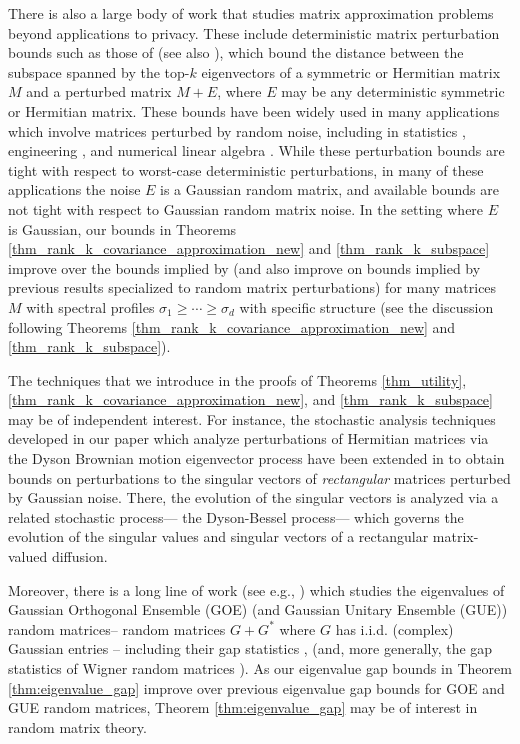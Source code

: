 \documentclass[11pt,letterpaper]{article}
\begin{document}
There is also a large body of work that studies matrix approximation problems beyond applications to privacy. 
%
These include deterministic matrix perturbation bounds such as those of \cite{davis1970rotation} (see also \cite{wedin1972perturbation}), which bound the distance between the subspace spanned by the top-$k$ eigenvectors of a symmetric or Hermitian matrix $M$ and a perturbed matrix $M + E$, where $E$ may be any deterministic symmetric or Hermitian matrix.
%
These bounds have been widely used in many applications which involve matrices perturbed by random noise, including in statistics \cite{yu2015useful}, engineering \cite{garg2021order, hajrya2013principal}, and numerical linear algebra \cite{cullum2002lanczos, hardt2014understanding}.
  While these perturbation bounds are tight with respect to worst-case deterministic perturbations, in many of these applications the noise $E$ is a Gaussian random matrix, and available bounds are not tight with respect to Gaussian random matrix noise.
   In the setting where $E$ is Gaussian, our bounds in Theorems \ref{thm_rank_k_covariance_approximation_new} and \ref{thm_rank_k_subspace} improve over the bounds implied by \cite{davis1970rotation} (and also improve on bounds implied by previous results \cite{o2018random} specialized to random matrix perturbations) for many matrices $M$ with spectral profiles $\sigma_1 \geq \cdots \geq \sigma_d$ with specific structure (see the discussion following Theorems \ref{thm_rank_k_covariance_approximation_new} and \ref{thm_rank_k_subspace}).
   
   
      The techniques that we introduce in the proofs of Theorems  \ref{thm_utility}, \ref{thm_rank_k_covariance_approximation_new}, and \ref{thm_rank_k_subspace} may be of independent interest.
  For instance, the stochastic analysis techniques developed in our paper which analyze perturbations of Hermitian matrices via the Dyson Brownian motion eigenvector process have been extended in \cite{lai2024singular} to obtain bounds on perturbations to the singular vectors of {\em rectangular} matrices perturbed by Gaussian noise.
%
 There, the evolution of the singular vectors is analyzed via a related stochastic process— the Dyson-Bessel process— which governs the evolution of the singular values and singular vectors of a rectangular matrix-valued diffusion.

Moreover, there is a long line of work (see e.g., \cite{wigner1955characteristic, dyson1962statistical, ginibre1965statistical, erdHos2012rigidity}) which studies the eigenvalues of Gaussian Orthogonal Ensemble (GOE) (and Gaussian Unitary Ensemble (GUE)) random matrices-- random matrices $G+G^\ast$ where $G$ has i.i.d. (complex) Gaussian entries -- including their gap statistics  \cite{ben2013extreme, feng2018large, feng2019small, forrester2018functional, giraud2022probing, bui2018gaps}, (and, more generally, the gap statistics of Wigner random matrices \cite{tao2013asymptotic, nguyen2017random}).
%
As our eigenvalue gap bounds in Theorem \ref{thm:eigenvalue_gap} improve over previous eigenvalue gap bounds \cite{nguyen2017random} for GOE and GUE random matrices, Theorem \ref{thm:eigenvalue_gap}  may be of interest in random matrix theory.
\end{document}

